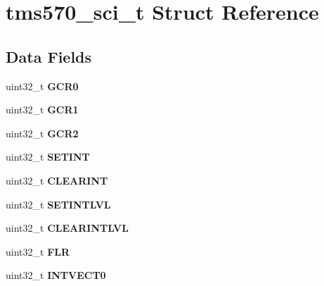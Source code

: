 \hypertarget{structtms570__sci__t}{}\section{tms570\+\_\+sci\+\_\+t Struct Reference}
\label{structtms570__sci__t}
\subsection*{Data Fields}
\begin{DoxyCompactItemize}
\item 
\mbox{\label{structtms570__sci__t_af804fbe57609337cd6d9cf9b16d7ae39}} 
uint32\+\_\+t {\bfseries G\+C\+R0}
\item 
\mbox{\label{structtms570__sci__t_a54dcc109551de7f4663bc56f982cfa72}} 
uint32\+\_\+t {\bfseries G\+C\+R1}
\item 
\mbox{\label{structtms570__sci__t_aabea3eac86ed8f6075cabae968c9a82b}} 
uint32\+\_\+t {\bfseries G\+C\+R2}
\item 
\mbox{\label{structtms570__sci__t_a4d6df56eedda2ede498aefbde0f94614}} 
uint32\+\_\+t {\bfseries S\+E\+T\+I\+NT}
\item 
\mbox{\label{structtms570__sci__t_a4ca4c2837e09cc8529f6544388738559}} 
uint32\+\_\+t {\bfseries C\+L\+E\+A\+R\+I\+NT}
\item 
\mbox{\label{structtms570__sci__t_a99e8519802db1ad4f9a2a82a05632f38}} 
uint32\+\_\+t {\bfseries S\+E\+T\+I\+N\+T\+L\+VL}
\item 
\mbox{\label{structtms570__sci__t_a8f7765be026c0fb2b42e5250086f3907}} 
uint32\+\_\+t {\bfseries C\+L\+E\+A\+R\+I\+N\+T\+L\+VL}
\item 
\mbox{\label{structtms570__sci__t_a10545be16e4094b05aa7f66cf29bda20}} 
uint32\+\_\+t {\bfseries F\+LR}
\item 
\mbox{\label{structtms570__sci__t_aec359a49f32768e294501b71f1801ff9}} 
uint32\+\_\+t {\bfseries I\+N\+T\+V\+E\+C\+T0}

\end{DoxyCompactItemize}
